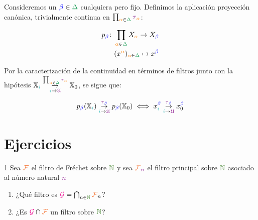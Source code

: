 \documentclass[titlepage,11pt,a4paper]{book}
\newcommand{\NN}{\ensuremath{\textcolor{OliveGreen}{\mathbb{N}}}}
\newcommand{\filt}{\ensuremath{\textcolor{Orange}{\mathcal{F}}}}
\newcommand{\gilt}{\ensuremath{\textcolor{Magenta}{\mathcal{G}}}}
\newcommand{\ultf}{\ensuremath{\textcolor{Plum}{\mathfrak{U}}}}
\newcommand{\ii}{\ensuremath{\textcolor{TealBlue}{i}}}
\newcommand{\nn}{\ensuremath{\textcolor{Plum}{n}}}
\newcommand{\alpa}{\textcolor{orange}{\alpha}}
\newcommand{\berta}{\textcolor{blue}{\beta}}
\newcommand{\Delt}{\textcolor{ForestGreen}{\Delta}}
\newcommand{\taut}{\textcolor{Fuchsia}{\tau}}
\newcommand{\borde}[1]{%
  \begingroup
  \setlength{\fboxsep}{2.5pt}%
  \setlength{\fboxrule}{1pt}%
  \textcolor{black}{\fbox{\normalcolor\ensuremath{#1}}}%
  \hspace{4pt}%
  \vspace{0.5 pt}
  \endgroup
}
\begin{document}
    \begin{dem}
        \borde{(1) \implies (2)} Consideremos un $\berta \in \Delt$ cualquiera pero fijo. Definimos la aplicación proyección canónica, trivialmente continua en $\prod_{\alpa \in \Delt} \taut_{\alpa}$:

        \bigskip
        \[
        \begin{aligned}
            p_{\berta} \colon  & \prod_{\alpa \in \Delt} X_{\alpa} \to X_{\berta}\\
            & (x^{\alpa})_{\alpa \in \Delt} \mapsto x^{\berta}
        \end{aligned}
        \]
        
        \medskip
        Por la caracterización de la continuidad en términos de filtros junto con la hipótesis $\mathbb{X}_{\ii} \underset{\ii \to \ultf}{\overset{\prod_{\alpa \in \Delt} \taut_{\alpa}}{\to}} \mathbb{X}_{0}$, se sigue que:

        \[
        p_{\berta}(\mathbb{X}_{\ii}) \underset{\ii \to \ultf}{\overset{\taut_{\berta}}{\to}} p_{\berta}(\mathbb{X}_{0}) \iff x_{\ii}^{\berta} \underset{\ii \to \ultf}{\overset{\taut_{\berta}}{\to}} x_{0}^{\berta}
        \]
    \end{dem}


    \section{Ejercicios}
     
    \begin{ejer*}{1}
        Sea $\filt$ el filtro de Fréchet sobre $\NN$ y sea $\filt_{\nn}$ el filtro principal sobre $\NN$ asociado al número natural $\nn$
        \smallskip
        \begin{enumerate}
            \item[(a)] ¿Qué filtro es $\gilt = \bigcap_{n \in \NN} \filt_{n}$?
            \item[(b)] ¿Es $\gilt \cap \filt $ un filtro sobre $\NN$?
        \end{enumerate}
    \end{ejer*}
\end{document}
